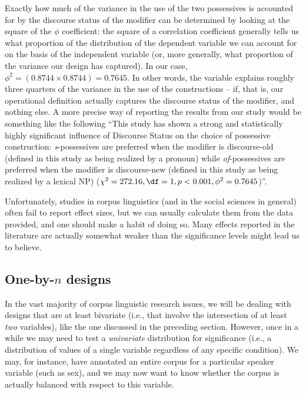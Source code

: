 Exactly how much of the variance  in the use of the two possessives  is accounted for by the discourse status of the modifier can be determined by looking at the square of the $\phi$ coefficient:  the square of a correlation coefficient generally tells us what proportion of the distribution  of the dependent variable we can account for on the basis of the independent variable (or, more generally, what proportion of the variance  our design  has captured). In our case, $\phi^2 = (0.8744 \times 0.8744 ) = 0.7645$. In other words, the variable  explains roughly three quarters of the variance  in the use of the  constructions -- if, that is, our operational  definition actually captures the discourse status of the modifier, and nothing else. A more precise way of reporting the results from our study would be something like the following ``This study has shown a strong and statistically highly significant  influence of Discourse Status on the choice of possessive  construction: \textit{s}-possessives are preferred when the modifier is discourse\hyp{}old (defined in this study as being realized by a pronoun)  while \textit{of}-possessives are preferred when the modifier is discourse\hyp{}new (defined in this study as being realized by a lexical NP)  ($\chi^2 = 272.16, \df = 1, p < 0.001, \phi^2 = 0.7645$)''.

Unfortunately, studies in corpus linguistics (and in the social sciences in general) often fail to report effect sizes,  but we can usually calculate them from the data provided, and one should make a habit of doing so. Many effects reported in the literature are actually somewhat weaker than the significance  levels might lead us to believe.

\subsection{One\hyp{}by\hyp{}$n$ designs}\label{sec:chisquareonebyn}\largerpage

In the vast majority of corpus linguistic research issues, we will be dealing with designs  that are at least bivariate  (i.e., that involve the intersection of at least \textit{two} variables), like the one discussed in the preceding section. However, once in a while we may need to test a \textit{univariate} distribution  for significance  (i.e., a distribution of values of a single variable regardless of any specific condition). We may, for instance, have annotated  an entire corpus for a particular speaker variable (such as sex), and we may now want to know whether the corpus is actually balanced with respect to this variable.

